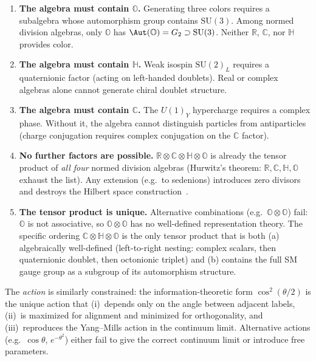 \documentclass[12pt,a4paper]{article}
\theoremstyle{definition}
\theoremstyle{remark}
\newcommand{\Oct}{\mathbb{O}}
\newcommand{\Quat}{\mathbb{H}}
\newcommand{\Comp}{\mathbb{C}}
\newcommand{\Real}{\mathbb{R}}
\newcommand{\SU}{\mathrm{SU}}
\begin{document}
\begin{enumerate}
\item \textbf{The algebra must contain $\Oct$.} Generating three colors 
requires a subalgebra whose automorphism group contains $\SU(3)$. Among 
normed division algebras, only $\Oct$ has $\Aut(\Oct) = G_2 \supset \SU(3)$. 
Neither $\Real$, $\Comp$, nor $\Quat$ provides color.

\item \textbf{The algebra must contain $\Quat$.} Weak isospin $\SU(2)_L$ 
requires a quaternionic factor (acting on left-handed doublets). Real or 
complex algebras alone cannot generate chiral doublet structure.

\item \textbf{The algebra must contain $\Comp$.} The $U(1)_Y$ hypercharge 
requires a complex phase. Without it, the algebra cannot distinguish 
particles from antiparticles (charge conjugation requires complex 
conjugation on the $\Comp$ factor).

\item \textbf{No further factors are possible.} $\Real\otimes\Comp\otimes 
\Quat\otimes\Oct$ is already the tensor product of \emph{all four} normed 
division algebras (Hurwitz's theorem: $\Real, \Comp, \Quat, \Oct$ exhaust 
the list). Any extension (e.g.\ to sedenions) introduces zero divisors and 
destroys the Hilbert space construction~\cite{Paper1}.

\item \textbf{The tensor product is unique.} Alternative combinations 
(e.g.\ $\Oct\otimes\Oct$) fail: $\Oct$ is not associative, so 
$\Oct\otimes\Oct$ has no well-defined representation theory. The specific 
ordering $\Comp\otimes\Quat\otimes\Oct$ is the only tensor product that is 
both (a) algebraically well-defined (left-to-right nesting: complex scalars, 
then quaternionic doublet, then octonionic triplet) and (b) contains the 
full SM gauge group as a subgroup of its automorphism structure.
\end{enumerate}

\noindent The \emph{action} is similarly constrained: the information-theoretic 
form $\cos^2(\theta/2)$ is the unique action that (i)~depends only on the angle 
between adjacent labels, (ii)~is maximized for alignment and minimized for 
orthogonality, and (iii)~reproduces the Yang--Mills action in the continuum 
limit. Alternative actions (e.g.\ $\cos\theta$, $e^{-\theta^2}$) either fail 
to give the correct continuum limit or introduce free parameters.
\end{document}
